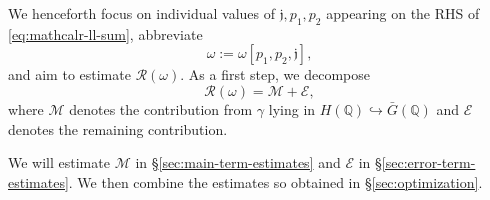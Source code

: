 We henceforth focus on individual values of $\mathfrak{j}, p_1, p_2$ appearing on the RHS of \eqref{eq:mathcalr-ll-sum}, abbreviate
\begin{equation*}
  \omega := \omega[p_1,p_2,\mathfrak{j}],
\end{equation*}
and aim to estimate $\mathcal{R}(\omega)$.  As a first step, we decompose
\begin{equation}\label{eq:mathc-=-mathc}
  \mathcal{R}(\omega) = \mathcal{M} + \mathcal{E},
\end{equation}
where $\mathcal{M}$ denotes the contribution from $\gamma$ lying in $H(\mathbb{Q}) \hookrightarrow \bar{G}(\mathbb{Q})$ and $\mathcal{E}$ denotes the remaining contribution.

We will estimate $\mathcal{M}$ in \S\ref{sec:main-term-estimates} and $\mathcal{E}$ in \S\ref{sec:error-term-estimates}.  We then combine the estimates so obtained in \S\ref{sec:optimization}.

